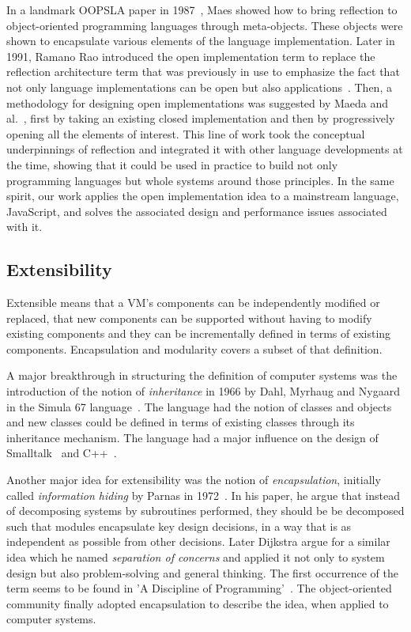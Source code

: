 In a landmark OOPSLA paper in 1987~\cite{Maes:1987}, Maes showed how to
bring reflection to object-oriented programming languages through meta-objects.
These objects were shown to encapsulate various elements of the language
implementation. Later in 1991, Ramano Rao introduced the open implementation
term to replace the reflection architecture term that was previously in use to
emphasize the fact that not only language implementations can be open but also
applications~\cite{Rao:1991}. Then, a methodology for designing open
implementations was suggested by Maeda and al.~\cite{Maeda:1997}, first by
taking an existing closed implementation and then by progressively opening all
the elements of interest. This line of work took the conceptual underpinnings
of reflection and integrated it with other language developments at the time,
showing that it could be used in practice to build not only programming
languages but whole systems around those principles. In the same spirit, our
work applies the open implementation idea to a mainstream language, JavaScript,
and solves the associated design and performance issues associated with it.

\subsection{Extensibility}

Extensible means that a VM's components can be independently modified or
replaced, that new components can be supported without having to modify
existing components and they can be incrementally defined in terms of existing
components. Encapsulation and modularity covers a subset of that definition. 

A major breakthrough in structuring the definition of computer systems was the
introduction of the notion of \textit{inheritance} in 1966 by Dahl, Myrhaug and
Nygaard in the Simula 67 language~\cite{Dahl:1968}. The language had the notion
of classes and objects and new classes could be defined in terms of existing
classes through its inheritance mechanism. The language had a major influence on
the design of Smalltalk~\cite{Kay:1993} and C++~\cite{Stroustrup:2007}.

Another major idea for extensibility was the notion of \textit{encapsulation},
initially called \textit{information hiding} by Parnas in
1972~\cite{Parnas:1972}. In his paper, he argue that instead of decomposing
systems by subroutines performed, they should be be decomposed such that modules
encapsulate key design decisions, in a way that is as independent as possible
from other decisions.  Later Dijkstra argue for a similar idea which he named
\textit{separation of concerns} and applied it not only to system design but
also problem-solving and general thinking. The first occurrence of the term
seems to be found in 'A Discipline of Programming'~\cite{dijkstra:1976}. The
object-oriented community finally adopted encapsulation to describe the idea,
when applied to computer systems.

